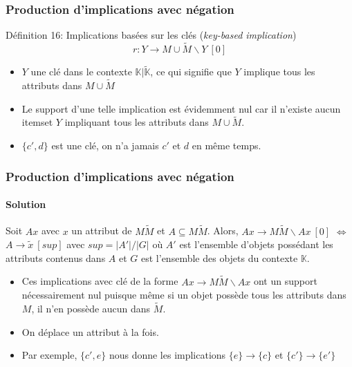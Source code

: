 \documentclass[french]{beamer}
\def\KK{\mathbb{K}}
\def\KKc{\mathbb{K}|\tilde{\mathbb{K}}}
\begin{document}
\begin{frame}
\frametitle{Production d'implications avec négation}
\begin{block}{Définition 16: Implications basées sur les clés (\emph{key-based implication})}
$$r: Y \rightarrow M \cup \tilde{M} \backslash Y \ [0]$$
\begin{itemize}
\item $Y$ une clé dans le contexte $\KKc$, ce qui signifie que $Y$ implique tous les attributs dans $M \cup \tilde{M}$
\item Le support d'une telle implication est évidemment nul car il n'existe aucun itemset $Y$ impliquant tous les attributs dans $M \cup \tilde{M}$.
\end{itemize}
\end{block}
\begin{itemize}
  \item $\{c',d\}$ est une clé, on n'a jamais $c'$ et $d$ en même temps.
\end{itemize}
\end{frame}
\begin{frame}
\frametitle{Production d'implications avec négation}
\framesubtitle{Solution}
 \begin{theorem}
Soit $Ax$ avec $x$ un attribut de $M\tilde{M}$ et $A \subseteq M\tilde{M}$. Alors, $Ax \rightarrow
M\tilde{M}\backslash Ax~[0]$
   $\Leftrightarrow$ $A \rightarrow \tilde{x}~[sup]$ avec $sup=|A'| / |G|$ où $A'$ est l'ensemble d'objets possédant les attributs contenus dans $A$ et $G$ est l'ensemble des objets du contexte $\KK$.
 \label{axiom1}
\end{theorem}
\begin{itemize}
  \item Ces implications avec clé de la forme $Ax \rightarrow M\tilde{M}\backslash Ax$ ont un support nécessairement nul puisque même si un objet possède tous les attributs dans $M$, il n'en possède aucun dans $\tilde{M}$.
  \item On déplace un attribut à la fois.
  \item Par exemple, $\{c',e\}$ nous donne les implications $\{e\} \rightarrow \{c\}$ et $\{c'\} \rightarrow \{e'\}$

\end{itemize}
\end{frame}
\end{document}
